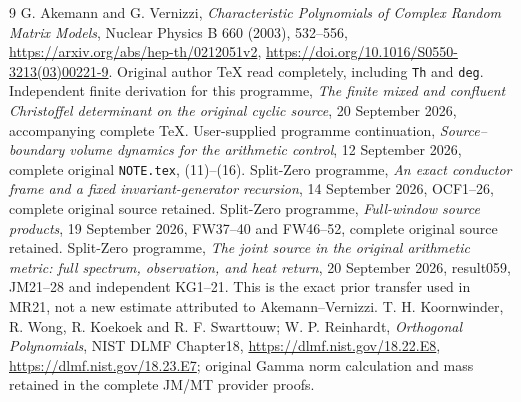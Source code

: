 \documentclass[11pt]{article}
\begin{document}
\begin{thebibliography}{9}
 G. Akemann and G. Vernizzi,
\emph{Characteristic Polynomials of Complex Random Matrix Models},
Nuclear Physics B 660 (2003), 532--556,
\url{https://arxiv.org/abs/hep-th/0212051v2},
\url{https://doi.org/10.1016/S0550-3213(03)00221-9}.
Original author TeX read completely, including \texttt{Th} and \texttt{deg}.
 Independent finite derivation for this programme,
\emph{The finite mixed and confluent Christoffel determinant on the
original cyclic source}, 20 September 2026, accompanying complete TeX.
 User-supplied programme continuation,
\emph{Source--boundary volume dynamics for the arithmetic control},
12 September 2026, complete original \texttt{NOTE.tex}, (11)--(16).
 Split-Zero programme,
\emph{An exact conductor frame and a fixed invariant-generator recursion},
14 September 2026, OCF1--26, complete original source retained.
 Split-Zero programme,
\emph{Full-window source products}, 19 September 2026,
FW37--40 and FW46--52, complete original source retained.
 Split-Zero programme,
\emph{The joint source in the original arithmetic metric: full spectrum,
observation, and heat return}, 20 September 2026, result059,
JM21--28 and independent KG1--21. This is the exact prior transfer
used in MR21, not a new estimate attributed to Akemann--Vernizzi.
 T. H. Koornwinder, R. Wong, R. Koekoek and R. F. Swarttouw;
W. P. Reinhardt, \emph{Orthogonal Polynomials}, NIST DLMF Chapter18,
\url{https://dlmf.nist.gov/18.22.E8},
\url{https://dlmf.nist.gov/18.23.E7}; original Gamma norm calculation
and mass retained in the complete JM/MT provider proofs.
\end{thebibliography}
\end{document}
